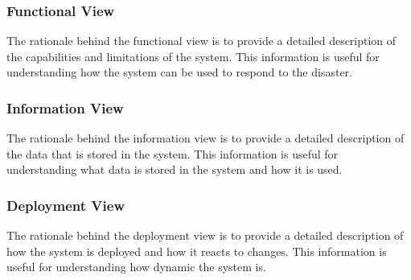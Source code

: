 \documentclass[a4paper]{article}
\begin{document}
    \subsubsection{Functional View}
    The rationale behind the functional view is to provide a detailed description of the capabilities and limitations of the
    system. This information is useful for understanding how the system can be used to respond to the disaster.
    \subsubsection{Information View}
    The rationale behind the information view is to provide a detailed description of the data that is stored in the system.
    This information is useful for understanding what data is stored in the system and how it is used.
    \subsubsection{Deployment View}
    The rationale behind the deployment view is to provide a detailed description of how the system is deployed and how it reacts
    to changes. This information is useful for understanding how dynamic the system is.
\end{document}
